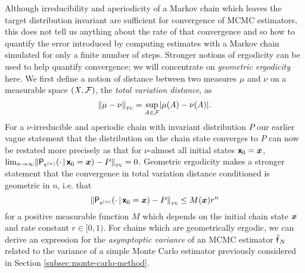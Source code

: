 Although irreducibility and aperiodicity of a Markov chain which leaves the target distribution invariant are sufficient for convergence of \ac{MCMC} estimators, this does not tell us anything about the rate of that convergence and so how to quantify the error introduced by computing estimates with a Markov chain simulated for only a finite number of steps. Stronger notions of ergodicity can be used to help quantify convergence; we will concentrate on \emph{geometric ergodicity} here. We first define a notion of distance between two measures $\mu$ and $\nu$ on a measurable space $(\mathit{X},\mathcal{F})$, the \emph{total variation distance}, as
\begin{equation}\label{eq:total-variation-measures}
  \left\Vert \mu - \nu \right\Vert_{\textsc{tv}} = \sup_{\set{A} \in \sset{F}} \left| \mu(\set{A}) - \nu(\set{A}) \right|.
\end{equation}
For a $\nu$-irreducible and aperiodic chain with invariant distribution $P$ our earlier vague statement that the distribution on the chain state converges to $P$ can now be restated more precisely as that for $\nu$-almost all initial states $\boldsymbol{\mathsf{x}}_0 = \boldsymbol{x}$, $\lim_{n\to\infty} \left\Vert \prob{\rvar{x}^{(n)}}\lpa \cdot \gvn \rvct{x}_0 = \vct{x}\rpa - \tgtprob \right\Vert_{\textsc{tv}} = 0$. Geometric ergodicity makes a stronger statement that the convergence in total variation distance conditioned is geometric in $n$, i.e. that
\vspace{-2mm}
\begin{equation}\label{eq:geometric-ergodicity}
  \left\Vert \prob{\rvar{x}^{(n)}}\lpa \cdot \gvn \rvct{x}_0 = \vct{x}\rpa - \tgtprob \right\Vert_{\textsc{tv}} \leq M(\vct{x}) r^n
\end{equation}
for a positive measurable function $M$ which depends on the initial chain state $\boldsymbol{x}$ and rate constant $r \in [0, 1)$. For chains which are geometrically ergodic, we can derive an expression for the \emph{asymptoptic variance} of an \ac{MCMC} estimator $\hatf_N$ related to the variance of a simple Monte Carlo estimator previously considered in Section \ref{subsec:monte-carlo-method}.

